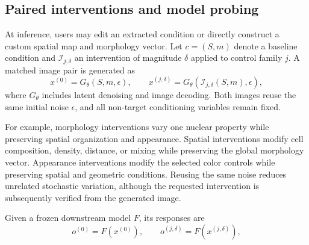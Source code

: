 \subsection{Paired interventions and model probing}
\label{sec:paired-interventions}

At inference, users may edit an extracted condition or directly construct a custom spatial map and morphology vector. Let
$c=(S,m)$ denote a baseline condition and
$\mathcal{I}_{j,\delta}$ an intervention of magnitude $\delta$ applied to control family $j$. A matched image pair is generated as
\begin{equation}
x^{(0)}
=
G_\theta(S,m,\epsilon),
\qquad
x^{(j,\delta)}
=
G_\theta\left(
    \mathcal{I}_{j,\delta}(S,m),
    \epsilon
\right),
\label{eq:counterfactual-pair}
\end{equation}
where $G_\theta$ includes latent denoising and image decoding. Both images reuse the same initial noise $\epsilon$, and all non-target conditioning variables remain fixed.

For example, morphology interventions vary one nuclear property while preserving spatial organization and appearance. Spatial interventions modify cell composition, density, distance, or mixing while preserving the global morphology vector. Appearance interventions modify the selected color controls while preserving spatial and geometric conditions. Reusing the same noise reduces unrelated stochastic variation, although the requested intervention is subsequently verified from the generated image.

Given a frozen downstream model $F$, its responses are
\begin{equation}
o^{(0)}=F(x^{(0)}),
\qquad
o^{(j,\delta)}=F(x^{(j,\delta)}),
\label{eq:probe-output}
\end{equation}
